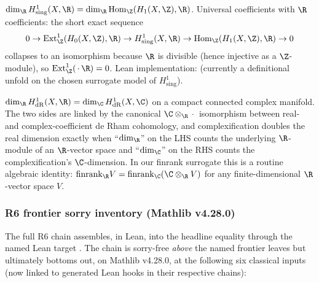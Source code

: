 \begin{lemma}
\label{lem:hodge-deRham-uct-bridge}
$\dim_\R H^1_{\mathrm{sing}}(X, \R) = \dim_\R \mathrm{Hom}_\Z(H_1(X, \Z), \R)$.  Universal coefficients with $\R$ coefficients: the short exact sequence
\[
0 \to \mathrm{Ext}^1_\Z(H_0(X, \Z), \R) \to H^1_{\mathrm{sing}}(X, \R) \to \mathrm{Hom}_\Z(H_1(X, \Z), \R) \to 0
\]
collapses to an isomorphism because $\R$ is divisible (hence injective as a $\Z$-module), so $\mathrm{Ext}^1_\Z(\,\cdot\, \R) = 0$.  Lean implementation:  (currently a definitional unfold on the chosen surrogate model of $H^1_{\mathrm{sing}}$).
\leanok
\end{lemma}

\begin{lemma}
\label{lem:hodge-deRham-real-of-complex}
$\dim_\R H^1_{\mathrm{dR}}(X, \R) = \dim_\C H^1_{\mathrm{dR}}(X, \C)$ on a compact connected complex manifold.  The two sides are linked by the canonical $\C \otimes_\R \,\cdot\,$ isomorphism between real- and complex-coefficient de Rham cohomology, and complexification doubles the real dimension exactly when ``$\dim_\R$'' on the LHS counts the underlying $\R$-module of an $\R$-vector space and ``$\dim_\C$'' on the RHS counts the complexification's $\C$-dimension.  In our finrank surrogate this is a routine algebraic identity: $\mathrm{finrank}_\R V = \mathrm{finrank}_\C(\C \otimes_\R V)$ for any finite-dimensional $\R$-vector space $V$.
\leanok
\end{lemma}

\subsubsection*{R6 frontier sorry inventory (Mathlib v4.28.0)}

The full R6 chain assembles, in Lean, into the headline equality
through the named Lean target
.
The chain is sorry-free \emph{above} the named frontier leaves but
ultimately bottoms out, on Mathlib v4.28.0, at the following six
classical inputs (now linked to generated Lean hooks in their respective
chains):

